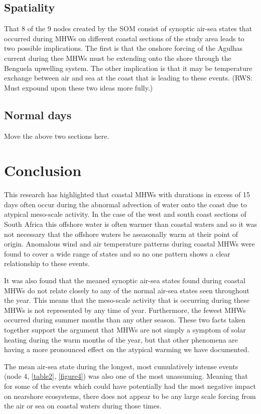 \documentclass[a4paper,10pt,review]{elsarticle}
\begin{document}
\subsection{Spatiality}
That 8 of the 9 nodes created by the SOM consist of synoptic air-sea states that occurred during MHWs on different coastal sections of the study area leads to two possible implications. The first is that the onshore forcing of the Agulhas current during thee MHWs must be extending onto the shore through the Benguela upwelling system. The other implication is that it may be temperature exchange between air and sea at the coast that is leading to these events. (RWS: Must expound upon these two ideas more fully.)

\subsection{Normal days}
Move the above two sections here.

\section{Conclusion}
This research has highlighted that coastal MHWs with durations in excess of 15 days often occur during the abnormal advection of water onto the coast due to atypical meso-scale activity. In the case of the west and south coast sections of South Africa this offshore water is often warmer than coastal waters and so it was not necessary that the offshore waters be aseasonally warm at their point of origin. Anomalous wind and air temperature patterns during coastal MHWs were found to cover a wide range of states and so no one pattern shows a clear relationship to these events.

It was also found that the meaned synoptic air-sea states found during coastal MHWs do not relate closely to any of the normal air-sea states seen throughout the year. This means that the meso-scale activity that is occurring during these MHWs is not represented by any time of year. Furthermore, the fewest MHWs occurred during summer months than any other season. These two facts taken together support the argument that MHWs are not simply a symptom of solar heating during the warm months of the year, but that other phenomena are having a more pronounced effect on the atypical warming we have documented.

The mean air-sea state during the longest, most cumulatively intense events (node 4, \cref{table2}, \cref{figure4}) was also one of the most unassuming. Meaning that for some of the events which could have potentially had the most negative impact on nearshore ecosystems, there does not appear to be any large scale forcing from the air or sea on coastal waters during those times.
\end{document}
